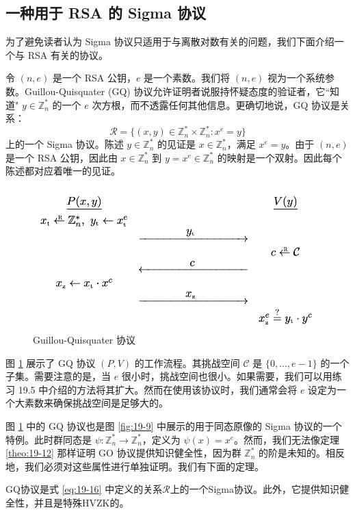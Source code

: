 \subsection{一种用于 RSA 的 Sigma 协议}\label{subsec:19-5-5}

为了避免读者认为 Sigma 协议只适用于与离散对数有关的问题，我们下面介绍一个与 RSA 有关的协议。

令 $(n,e)$ 是一个 RSA 公钥，$e$ 是一个素数。我们将 $(n,e)$ 视为一个系统参数。Guillou-Quisquater (GQ) 协议允许证明者说服持怀疑态度的验证者，它``知道" $y\in\mathbb{Z}_n^*$ 的一个 $e$ 次方根，而不透露任何其他信息。更确切地说，GQ 协议是关系：
\begin{equation}\label{eq:19-16}
\mathcal{R}=
\bigg\lbrace
(x,y)\in\mathbb{Z}_n^*\times\mathbb{Z}_n^*:x^e=y
\bigg\rbrace
\end{equation}
上的一个 Sigma 协议。陈述 $y\in\mathbb{Z}_n^*$ 的见证是 $x\in\mathbb{Z}_n^*$，满足 $x^e=y$。由于 $(n,e)$ 是一个 RSA 公钥，因此由 $x\in\mathbb{Z}_n^*$ 到 $y=x^e\in\mathbb{Z}_n^*$ 的映射是一个双射。因此每个陈述都对应着唯一的见证。

\begin{figure}
  \centering
  \includegraphics[width=0.6\linewidth]{figures/chapter19/fig10.png}
  \caption{Guillou-Quisquater 协议}
  \label{fig:19-10}
\end{figure}


图 \ref{fig:19-10} 展示了 GQ 协议 $(P,V)$ 的工作流程。其挑战空间 $\mathcal{C}$ 是 $\{0,\dots,e-1\}$ 的一个子集。需要注意的是，当 $e$ 很小时，挑战空间也很小。如果需要，我们可以用练习 19.5 中介绍的方法将其扩大。然而在使用该协议时，我们通常会将 $e$ 设定为一个大素数来确保挑战空间是足够大的。

图 \ref{fig:19-10} 中的 GQ 协议也是图 \ref{fig:19-9} 中展示的用于同态原像的 Sigma 协议的一个特例。此时群同态是 $\psi:\mathbb{Z}_n^*\to\mathbb{Z}_n^*$，定义为 $\psi(x)=x^e$。然而，我们无法像定理 \ref{theo:19-12} 那样证明 GO 协议提供知识健全性，因为群 $\mathbb{Z}_n^*$ 的阶是未知的。相反地，我们必须对这些属性进行单独证明。我们有下面的定理。

\begin{theorem}
GQ协议是式 \ref{eq:19-16} 中定义的关系$\mathcal R$上的一个Sigma协议。此外，它提供知识健全性，并且是特殊HVZK的。
\end{theorem}

